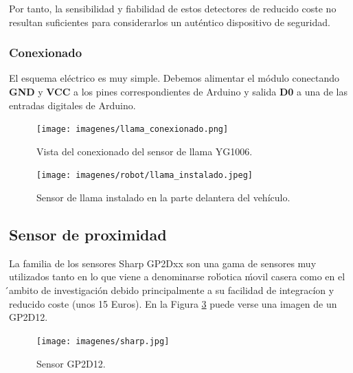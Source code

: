 Por tanto, la sensibilidad y fiabilidad de estos detectores de reducido coste no resultan suficientes para considerarlos un auténtico dispositivo de seguridad.\\
 
\subsubsection{Conexionado}

El esquema eléctrico es muy simple. Debemos alimentar el módulo conectando \textbf{GND} y \textbf{VCC} a los pines correspondientes de Arduino y salida \textbf{D0} a una de las 
entradas digitales de Arduino.\\

 \begin{figure}[H]
  \begin{center}
    \texttt{[image: imagenes/llama\_conexionado.png]}
  \end{center}
  \caption{Vista del conexionado del sensor de llama YG1006.}
  \label{figura:sensor_mq_2_potenciometro}
\end{figure}

 \begin{figure}[H]
  \begin{center}
    \texttt{[image: imagenes/robot/llama\_instalado.jpeg]}
  \end{center}
  \caption{Sensor de llama instalado en la parte delantera del vehículo.}
  \label{figura:sensor_mq_2_potenciometro}
\end{figure}

\subsection{Sensor de proximidad}

La familia de los sensores Sharp GP2Dxx son una gama de sensores muy utilizados tanto en lo que viene a denominarse rob́otica ḿovil casera como en el ́ambito de investigación debido
principalmente a su facilidad de integracíon y reducido coste (unos 15  Euros). En la Figura \ref{figura:sensor_sharp} puede verse una imagen de un GP2D12.\\

 \begin{figure}[H]
  \begin{center}
    \texttt{[image: imagenes/sharp.jpg]}
  \end{center}
  \caption{Sensor GP2D12.}
  \label{figura:sensor_sharp}
\end{figure}

